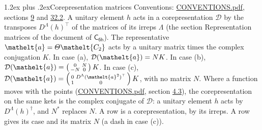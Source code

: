 \documentclass[10pt,a4paper]{article}
\makeatletter
\renewcommand\section{\@startsection{section}{1}{\z@}{-3ex plus -1ex minus -.2ex}%
  {1.2ex plus .2ex}{\normalfont\large\sffamily\bfseries\color{parttitle}}}
\numberwithin{equation}{section}
\newcommand{\eltfont}[1]{{\let\sigma\eltsigma\mathelt{#1}}}
\newcommand{\grp}[1]{\mathsf{#1}}
\newcommand{\elt}[1]{\eltfont{#1}}
\makeatother
\begin{document}
\section{Corepresentation matrices}\label{s:corep_matrices}
Conventions: \href{../../CONVENTIONS.pdf}{CONVENTIONS.pdf}, sections \href{../../../rotation/CONVENTIONS.pdf\#conv.9}{9} and \href{../../CONVENTIONS.pdf\#conv.32.2}{32.2}.
A unitary element $h$ acts in a corepresentation $\mathcal{D}$ by the transposes $D^{\Lambda}(h)^{\top}$ of the matrices of its irreps $\Lambda$ (the section Representation matrices of the document of \href{../../../rotation/data/pdf/C6h.pdf}{$\grp{C_{6h}}$}). The representative $\elt{a} = \varTheta\elt{C_{2}}$ acts by a unitary matrix times the complex conjugation $K$.
In case (a), $\mathcal{D}(\elt{a}) = NK$. In case (b), $\mathcal{D}(\elt{a}) = \left(\begin{smallmatrix} 0 & N \\ -N & 0 \end{smallmatrix}\right) K$. In case (c), $\mathcal{D}(\elt{a}) = \left(\begin{smallmatrix} 0 & D^{\Lambda}(\elt{a}^2)^{\top} \\ 1 & 0 \end{smallmatrix}\right) K$, with no matrix $N$.
Where a function moves with the points (\href{../../CONVENTIONS.pdf}{CONVENTIONS.pdf}, section \href{../../../rotation/CONVENTIONS.pdf\#conv.4.3}{4.3}), the corepresentation on the same kets is the complex conjugate of $\mathcal{D}$: a unitary element $h$ acts by $D^{\Lambda}(h)^{\dagger}$, and $N^{*}$ replaces $N$.
A row is a corepresentation, by its irreps. A row gives its case and its matrix $N$ (a dash in case (c)).
\end{document}
